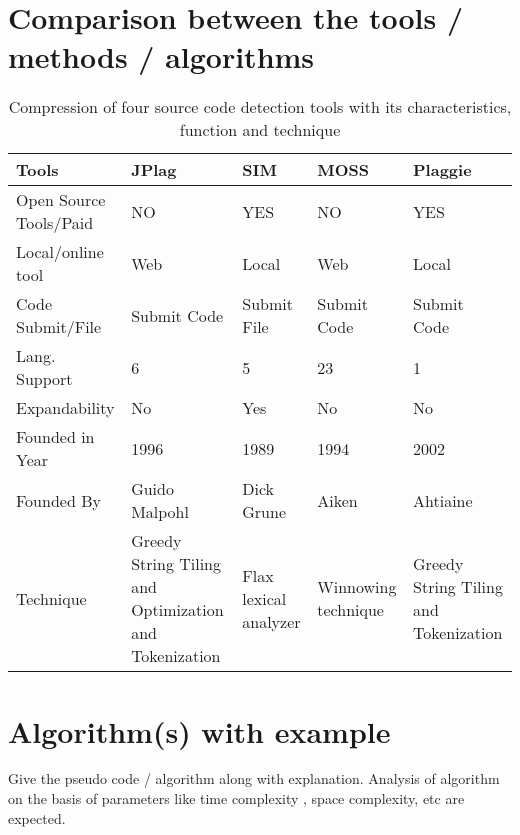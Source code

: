 	\section{Comparison between the tools / methods / algorithms}
	
	\begin{table}[h!]
	  \centering
	  \caption{Compression of four source code detection tools with its characteristics, function and technique}
	  \label{tab:table1}
	  \begin{tabular}{|p{3cm}|p{3cm}|p{3cm}|p{3cm}|p{3cm}|}
	\hline 
	Tools & JPlag & SIM & MOSS & Plaggie \\ \hline
	
	Open Source Tools/Paid & NO & YES & NO & YES \\ \hline
	Local/online tool & Web & Local & Web & Local  \\ \hline
	Code Submit/File & Submit Code & Submit File & Submit
	Code & Submit Code  \\ \hline
	Lang. Support & 6 & 5 & 23 & 1 \\ \hline
	Expandability & No & Yes & No & No \\ \hline
	Founded in Year & 1996 & 1989 & 1994 & 2002 \\ \hline
	Founded By  & Guido Malpohl & Dick Grune & Aiken & Ahtiaine \\ \hline
	
	Technique & Greedy String Tiling and Optimization and Tokenization & Flax lexical analyzer & Winnowing technique & Greedy String Tiling and Tokenization \\ \hline	\end{tabular}
	\end{table}  
	
	\section{Algorithm(s) with example}
	
	Give the pseudo code / algorithm along with explanation. Analysis of algorithm on the basis of parameters like time complexity , space complexity, etc are expected. 